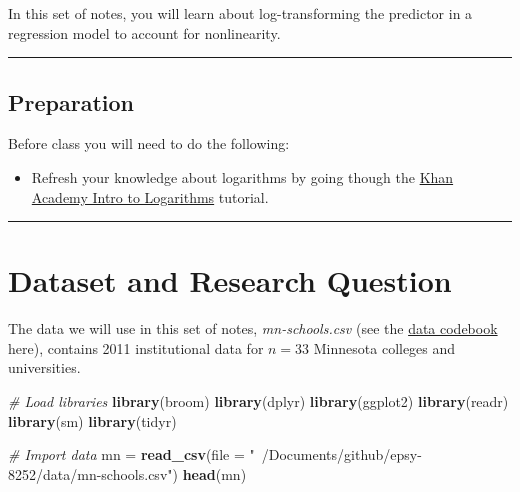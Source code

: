 \documentclass[]{book}
\newenvironment{Shaded}{\begin{snugshade}}{\end{snugshade}}
\newcommand{\CommentTok}[1]{\textcolor[rgb]{0.56,0.35,0.01}{\textit{#1}}}
\newcommand{\DataTypeTok}[1]{\textcolor[rgb]{0.13,0.29,0.53}{#1}}
\newcommand{\KeywordTok}[1]{\textcolor[rgb]{0.13,0.29,0.53}{\textbf{#1}}}
\newcommand{\NormalTok}[1]{#1}
\newcommand{\StringTok}[1]{\textcolor[rgb]{0.31,0.60,0.02}{#1}}
\providecommand{\tightlist}{%
  \setlength{\itemsep}{0pt}\setlength{\parskip}{0pt}}
\begin{document}
In this set of notes, you will learn about log-transforming the predictor in a regression model to account for nonlinearity.

\begin{center}\rule{0.5\linewidth}{\linethickness}\end{center}

\hypertarget{preparation-1}{%
\subsection*{Preparation}\label{preparation-1}}

Before class you will need to do the following:

\begin{itemize}
\tightlist
\item
  Refresh your knowledge about logarithms by going though the \href{https://www.khanacademy.org/math/algebra2/exponential-and-logarithmic-functions/introduction-to-logarithms/v/logarithms}{Khan Academy Intro to Logarithms} tutorial.
\end{itemize}

\begin{center}\rule{0.5\linewidth}{\linethickness}\end{center}

\hypertarget{dataset-and-research-question}{%
\section{Dataset and Research Question}\label{dataset-and-research-question}}

The data we will use in this set of notes, \emph{mn-schools.csv} (see the \protect\hyperlink{mn-schools}{data codebook} here), contains 2011 institutional data for \(n=33\) Minnesota colleges and universities.

\begin{Shaded}
\begin{Highlighting}[]
\CommentTok{# Load libraries}
\KeywordTok{library}\NormalTok{(broom)}
\KeywordTok{library}\NormalTok{(dplyr)}
\KeywordTok{library}\NormalTok{(ggplot2)}
\KeywordTok{library}\NormalTok{(readr)}
\KeywordTok{library}\NormalTok{(sm)}
\KeywordTok{library}\NormalTok{(tidyr)}

\CommentTok{# Import data}
\NormalTok{mn =}\StringTok{ }\KeywordTok{read_csv}\NormalTok{(}\DataTypeTok{file =} \StringTok{"~/Documents/github/epsy-8252/data/mn-schools.csv"}\NormalTok{)}
\KeywordTok{head}\NormalTok{(mn)}
\end{Highlighting}
\end{Shaded}
\end{document}
